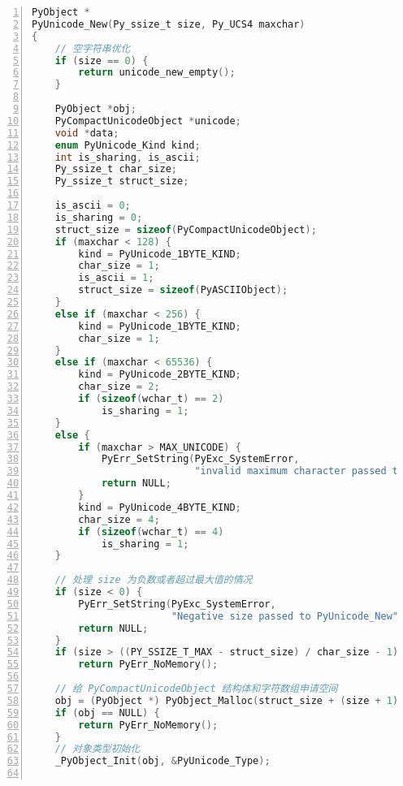 \begin{lstlisting}[language=C, numbers=left, numbersep=1em, numberstyle=\footnotesize , breaklines=true]
PyObject *
PyUnicode_New(Py_ssize_t size, Py_UCS4 maxchar)
{
    // 空字符串优化
    if (size == 0) {
        return unicode_new_empty();
    }

    PyObject *obj;
    PyCompactUnicodeObject *unicode;
    void *data;
    enum PyUnicode_Kind kind;
    int is_sharing, is_ascii;
    Py_ssize_t char_size;
    Py_ssize_t struct_size;

    is_ascii = 0;
    is_sharing = 0;
    struct_size = sizeof(PyCompactUnicodeObject);
    if (maxchar < 128) {
        kind = PyUnicode_1BYTE_KIND;
        char_size = 1;
        is_ascii = 1;
        struct_size = sizeof(PyASCIIObject);
    }
    else if (maxchar < 256) {
        kind = PyUnicode_1BYTE_KIND;
        char_size = 1;
    }
    else if (maxchar < 65536) {
        kind = PyUnicode_2BYTE_KIND;
        char_size = 2;
        if (sizeof(wchar_t) == 2)
            is_sharing = 1;
    }
    else {
        if (maxchar > MAX_UNICODE) {
            PyErr_SetString(PyExc_SystemError,
                            "invalid maximum character passed to PyUnicode_New");
            return NULL;
        }
        kind = PyUnicode_4BYTE_KIND;
        char_size = 4;
        if (sizeof(wchar_t) == 4)
            is_sharing = 1;
    }

    // 处理 size 为负数或者超过最大值的情况
    if (size < 0) {
        PyErr_SetString(PyExc_SystemError,
                        "Negative size passed to PyUnicode_New");
        return NULL;
    }
    if (size > ((PY_SSIZE_T_MAX - struct_size) / char_size - 1))
        return PyErr_NoMemory();

    // 给 PyCompactUnicodeObject 结构体和字符数组申请空间
    obj = (PyObject *) PyObject_Malloc(struct_size + (size + 1) * char_size);
    if (obj == NULL) {
        return PyErr_NoMemory();
    }
    // 对象类型初始化
    _PyObject_Init(obj, &PyUnicode_Type);


\end{lstlisting}
